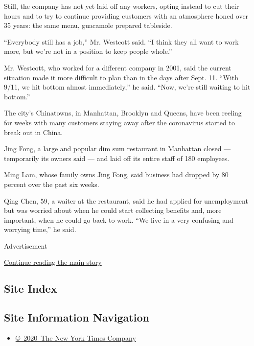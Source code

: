 Still, the company has not yet laid off any workers, opting instead to
cut their hours and to try to continue providing customers with an
atmosphere honed over 35 years: the same menu, guacamole prepared
tableside.

``Everybody still has a job,'' Mr. Westcott said. ``I think they all
want to work more, but we're not in a position to keep people whole.''

Mr. Westcott, who worked for a different company in 2001, said the
current situation made it more difficult to plan than in the days after
Sept. 11. ``With 9/11, we hit bottom almost immediately,'' he said.
``Now, we're still waiting to hit bottom.''

The city's Chinatowns, in Manhattan, Brooklyn and Queens, have been
reeling for weeks with many customers staying away after the coronavirus
started to break out in China.

Jing Fong, a large and popular dim sum restaurant in Manhattan closed
--- temporarily its owners said --- and laid off its entire staff of 180
employees.

Ming Lam, whose family owns Jing Fong, said business had dropped by 80
percent over the past six weeks.

Qing Chen, 59, a waiter at the restaurant, said he had applied for
unemployment but was worried about when he could start collecting
benefits and, more important, when he could go back to work. ``We live
in a very confusing and worrying time,'' he said.

Advertisement

\protect\hyperlink{after-bottom}{Continue reading the main story}

\hypertarget{site-index}{%
\subsection{Site Index}\label{site-index}}

\hypertarget{site-information-navigation}{%
\subsection{Site Information
Navigation}\label{site-information-navigation}}

\begin{itemize}
\tightlist
\item
  \href{https://help.nytimes3xbfgragh.onion/hc/en-us/articles/115014792127-Copyright-notice}{©~2020~The
  New York Times Company}
\end{itemize}

